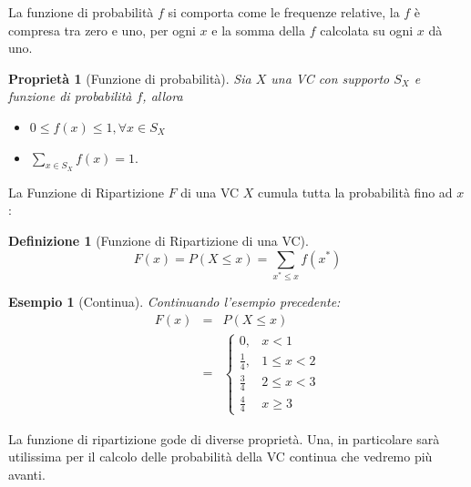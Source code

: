 \documentclass[
  11pt,
]{book}
\providecommand{\tightlist}{%
  \setlength{\itemsep}{0pt}\setlength{\parskip}{0pt}}
\theoremstyle{mytheoremstyle}
\newtheorem{proposition}{Proprietà}[section]
\theoremstyle{mydefstyle}
\newtheorem{definition}{Definizione}[section]
\newtheorem{example}{{Esempio}}[section]
\begin{document}
La funzione di probabilità \(f\) si comporta come le frequenze relative,
la \(f\) è compresa tra zero e uno, per ogni \(x\) e
la somma della \(f\) calcolata su ogni \(x\) dà uno.

\begin{info}

\begin{proposition}[Funzione di probabilità]

Sia \(X\) una VC con supporto \(S_X\) e funzione di probabilità \(f\), allora

\begin{itemize}
\tightlist
\item
  \(0\le f(x)\le1,\forall x\in S_X\)
\item
  \(\sum_{x\in S_X} f(x) = 1.\)
\end{itemize}

\end{proposition}

\end{info}

La Funzione di Ripartizione \(F\) di una VC \(X\) cumula tutta la probabilità fino ad \(x\):

\begin{info}

\begin{definition}[Funzione di Ripartizione di una VC]
\[
F(x)=P(X\le x)=\sum_{x^*\le x} f(x^*)
\]
\end{definition}

\end{info}

\begin{example}[Continua]
Continuando l'esempio precedente:
\begin{eqnarray*}
F(x)&=&P(X\le x)\\
    &=&\begin{cases}
    0, &x<1\\
    \frac 1 4, &1\le x<2\\
    \frac 3 4 &2\le x< 3\\
    \frac 4 4 & x\ge 3
    \end{cases}
\end{eqnarray*}
\end{example}

La funzione di ripartizione gode di diverse proprietà. Una, in particolare sarà utilissima
per il calcolo delle probabilità della VC continua che vedremo più avanti.
\end{document}
